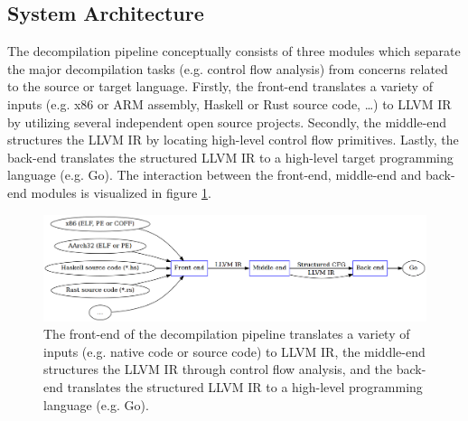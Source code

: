 



\subsection{System Architecture}

The decompilation pipeline conceptually consists of three modules which separate the major decompilation tasks (e.g. control flow analysis) from concerns related to the source or target language. Firstly, the front-end translates a variety of inputs (e.g. x86 or ARM assembly, Haskell or Rust source code, …) to LLVM IR by utilizing several independent open source projects. Secondly, the middle-end structures the LLVM IR by locating high-level control flow primitives. Lastly, the back-end translates the structured LLVM IR to a high-level target programming language (e.g. Go). The interaction between the front-end, middle-end and back-end modules is visualized in figure \ref{fig:decompilation_pipeline}.

\begin{figure}[htbp]
	\begin{center}
		\includegraphics[width=\textwidth]{inc/decompilation_pipeline.png}
		\caption{The front-end of the decompilation pipeline translates a variety of inputs (e.g. native code or source code) to LLVM IR, the middle-end structures the LLVM IR through control flow analysis, and the back-end translates the structured LLVM IR to a high-level programming language (e.g. Go).}
		\label{fig:decompilation_pipeline}
	\end{center}
\end{figure}

